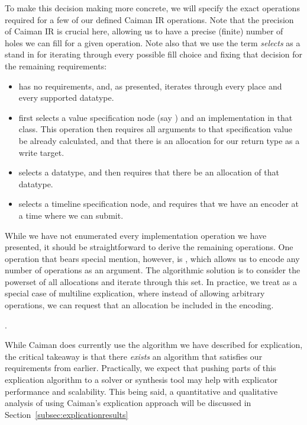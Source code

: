 To make this decision making more concrete, we will specify the exact operations required for a few of our defined Caiman IR operations.  Note that the precision of Caiman IR is crucial here, allowing us to have a precise (finite) number of holes we can fill for a given operation.  Note also that we use the term \emph{selects} as a stand in for iterating through every possible fill choice and fixing that decision for the remaining requirements:
\begin{itemize}
\item {} has no requirements, and, as presented, iterates through every place and every supported datatype.
\item {} first selects a value specification node (say ) and an implementation in that class.  This operation then requires all arguments to that specification value be already calculated, and that there is an allocation for our return type as a write target.
\item {} selects a datatype, and then requires that there be an allocation of that datatype.
\item {} selects a timeline specification node, and requires that we have an encoder at a time where we can submit.
\end{itemize}
While we have not enumerated every implementation operation we have presented, it should be straightforward to derive the remaining operations.  One operation that bears special mention, however, is , which allows us to encode any number of operations as an argument.  The algorithmic solution is to consider the powerset of all allocations and iterate through this set.  In practice, we treat  as a special case of multiline explication, where instead of allowing arbitrary operations, we can request that an allocation be included in the encoding.

.

While Caiman does currently use the algorithm we have described for explication, the critical takeaway is that there \emph{exists} an algorithm that satisfies our requirements from earlier.  Practically, we expect that pushing parts of this explication algorithm to a solver or synthesis tool may help with explicator performance and scalability.  This being said, a quantitative and qualitative analysis of using Caiman's explication approach will be discussed in Section~\ref{subsec:explicationresults}

